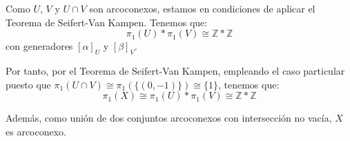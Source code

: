 \begin{ejercicio}
\begin{enumerate}[label=\alph*)]
            Como $U$, $V$ y $U\cap V$ son arcoconexos, estamos en condiciones de aplicar el Teorema de Seifert-Van Kampen. Tenemos que:
            \begin{equation*}
                \pi_1(U)\ast \pi_1(V) \cong \mathbb{Z}\ast \mathbb{Z}
            \end{equation*}
            con generadores $[\alpha]_U$ y $[\beta]_V$.

            Por tanto, por el Teorema de Seifert-Van Kampen, empleando el caso particular puesto que $\pi_1(U\cap V) \cong \pi_1(\{(0,-1)\}) \cong \{1\}$, tenemos que:
            \begin{equation*}
                \pi_1(X) \cong \pi_1(U)\ast \pi_1(V) \cong \mathbb{Z}\ast \mathbb{Z}
            \end{equation*}

            Además, como unión de dos conjuntos arcoconexos con intersección no vacía, $X$ es arcoconexo.
    \end{enumerate}
\end{ejercicio}

